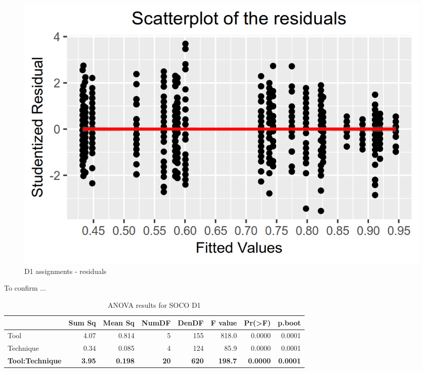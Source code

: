 \documentclass[a4paper, 12pt, oneside, openany, final, pdftex]{book}\usepackage[]{graphicx}\usepackage[]{color}
\makeatletter
\def\maxwidth{ %
  \ifdim\Gin@nat@width>\linewidth
    \linewidth
  \else
    \Gin@nat@width
  \fi
}
\newenvironment{knitrout}{}{} %
\makeatother
\begin{document}
\begin{figure}
\begin{knitrout}
\end{knitrout}
    \endminipage\hfill 
\begin{knitrout}
\color{fgcolor}
\includegraphics[width=\maxwidth]{figure/Figure-Scatter-D1-1} 

\end{knitrout}
    \endminipage
	\caption{D1 assignments - residuals}\label{fig:normalityD1F1}
\end{figure}

To confirm ...

\begin{table}
  \centering 
  \caption{ANOVA results for SOCO D1}\label{tbl:anovaSOCOD1}

\begin{tabular}{lrrrrrrr}
\toprule
\multicolumn{1}{c}{\textbf{ }} & \multicolumn{1}{c}{\textbf{Sum Sq}} & \multicolumn{1}{c}{\textbf{Mean Sq}} & \multicolumn{1}{c}{\textbf{NumDF}} & \multicolumn{1}{c}{\textbf{DenDF}} & \multicolumn{1}{c}{\textbf{F value}} & \multicolumn{1}{c}{\textbf{Pr(>F)}} & \multicolumn{1}{c}{\textbf{p.boot}}\\
\midrule
\rowcolor{gray!6}  Tool & 4.07 & 0.814 & 5 & 155 & 818.0 & 0.0000 & 0.0001\\
Technique & 0.34 & 0.085 & 4 & 124 & 85.9 & 0.0000 & 0.0001\\
\rowcolor{gray!6}  \textbf{Tool:Technique} & \textbf{3.95} & \textbf{0.198} & \textbf{20} & \textbf{620} & \textbf{198.7} & \textbf{0.0000} & \textbf{0.0001}\\
\bottomrule
\end{tabular}


\end{table}
\end{document}
